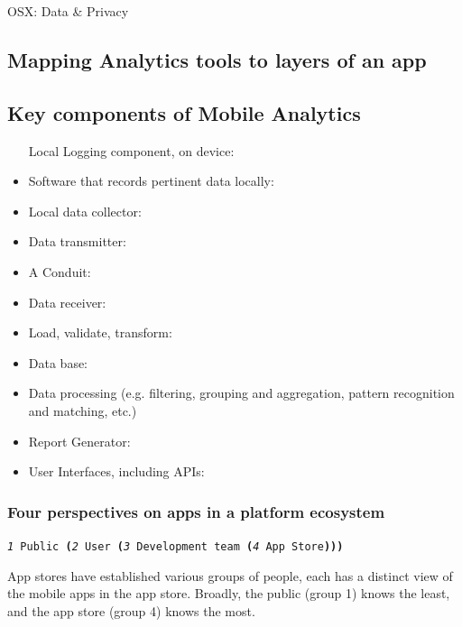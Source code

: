 OSX: Data \& Privacy

\subsection{Mapping Analytics tools to layers of an app}

\subsection{Key components of Mobile Analytics}
\begin{itemize}
    \item [Local] Logging component, on device:
    \item Software that records pertinent data locally:
    \item Local data collector:
    \item Data transmitter:
    \item A Conduit:
    \item Data receiver:
    \item Load, validate, transform:
    \item Data base:
    \item Data processing (e.g. filtering, grouping and aggregation, pattern recognition and matching, etc.)
    \item Report Generator:
    \item User Interfaces, including APIs:
\end{itemize}

\subsubsection{Four perspectives on apps in a platform ecosystem}
\large{\texttt{\emph{1} Public \textbf{(}\emph{2} User \textbf{(}\emph{3} Development team \textbf{(}\emph{4} App Store\textbf{)))}}}

App stores have established various groups of people, each has a distinct view of the mobile apps in the app store. Broadly, the public (group 1) knows the least, and the app store (group 4) knows the most.

